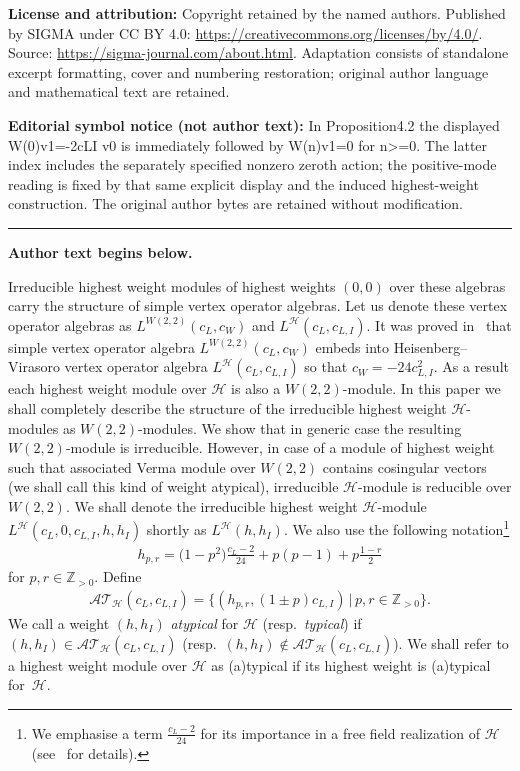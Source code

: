 \documentclass[11pt]{article}
\numberwithin{equation}{section}
\newcommand{\N}{{\mathbb Z}_{> 0} }
\newcommand{\HVir}{\mathcal H}
\begin{document}
\noindent\textbf{License and attribution:} Copyright retained by the named authors. Published by SIGMA under CC BY 4.0: \url{https://creativecommons.org/licenses/by/4.0/}. Source: \url{https://sigma-journal.com/about.html}. Adaptation consists of standalone excerpt formatting, cover and numbering restoration; original author language and mathematical text are retained.\par
\noindent\textbf{Editorial symbol notice (not author text):} In Proposition4.2 the displayed W(0)v1=\allowbreak{}-2cLI v0 is immediately followed by W(n)v1=\allowbreak{}0 for n>=\allowbreak{}0. The latter index includes the separately specified nonzero zeroth action; the positive-mode reading is fixed by that same explicit display and the induced highest-weight construction. The original author bytes are retained without modification.\par
\medskip\hrule\medskip\noindent\textbf{Author text begins below.}\par
\setcounter{section}{1}
\setcounter{subsection}{0}
\setcounter{subsubsection}{0}
\setcounter{Theorem}{0}
\setcounter{equation}{0}
Irreducible highest weight modules of highest weights $(0,0)$ over these algebras carry the structure of simple vertex operator algebras. Let us denote these vertex operator algebras as $L^{W(2,2)} (c_L, c_W)$ and $L^{\HVir} (c_L, c_{L,I} )$. It was proved in~\cite{nas} that simple vertex operator algebra $L^{W(2,2)} (c_L, c_W)$ embeds into Heisenberg--Virasoro vertex operator algebra $L^{\HVir} (c_L, c_{L,I} )$ so that $c_W = -24 c_{L,I} ^2$. As a result each highest weight module over $\HVir$ is also a $W(2,2)$-module. In this paper we shall completely describe the structure of the irreducible highest weight $\HVir$-modules as $W(2,2)$-modules. We show that in generic case the resulting $W(2,2)$-module is irreducible. However, in case of a module of highest weight such that associated Verma module over $W(2,2)$ contains cosingular vectors (we shall call this kind of weight atypical), irreducible $\HVir$-module is reducible over $W(2,2)$.
We shall denote the irreducible highest weight $ \HVir $-module $L^{\HVir}(c_L,0,c_{L,I},h,h_I) $ shortly as $L^{\HVir}(h,h_I)$.
 We also use the following notation\footnote{We emphasise a term $\frac{c_L-2}{24} $ for its importance in a free f\/ield realization of $\HVir $ (see~\cite{nas} for details).}
\begin{gather*}
h_{p,r}=\big(1-p^{2}\big)\frac{c_{L}-2}{24}+p(p-1)+p\frac{1-r}{2} %
\end{gather*}
for $ p,r \in \N $. Def\/ine
\begin{gather*}
{\mathcal {AT} }_{\HVir} ( c_L, c_{L,I} ) = \{ (h_{p,r},(1\pm p)c_{L,I}) \,|\, p,r \in \N \}.
\end{gather*}
We call a weight $(h,h_I)$ \textit{atypical} for $\HVir $ (resp.\ \textit{typical}) if $(h,h_I) \in {\mathcal {AT} } _{\HVir} ( c_L, c_{L,I} ) $ (resp.\ $(h,h_I) \notin {\mathcal {AT} } _{\HVir} ( c_L, c_{L,I} ) $). We shall refer to a highest weight module over $\HVir$ as (a)typical if its highest weight is (a)typical for~$\HVir$.
\end{document}
